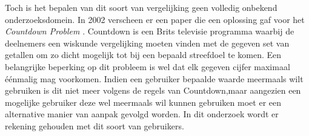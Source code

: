 \documentclass[Main.tex]{subfiles}
\begin{document}
Toch is het bepalen van dit soort van vergelijking geen volledig onbekend onderzoeksdomein. In 2002 verscheen er een paper die een oplossing gaf voor het \textit{Countdown Problem} \cite{countdown}. Countdown is een Brits televisie programma waarbij de deelnemers een wiskunde vergelijking moeten vinden met de gegeven set van getallen om zo dicht mogelijk tot bij een bepaald streefdoel te komen. Een belangrijke beperking op dit probleem is wel dat elk gegeven cijfer maximaal \'e\'enmalig mag voorkomen. Indien een gebruiker bepaalde waarde meermaals wilt gebruiken is dit niet meer volgens de regels van Countdown,maar aangezien een mogelijke gebruiker deze wel meermaals wil kunnen gebruiken moet er een alternative manier van aanpak gevolgd worden. In dit onderzoek wordt er rekening gehouden met dit soort van gebruikers.
\end{document}
